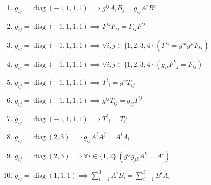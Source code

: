 \documentclass[11pt,a4paper]{article}
\begin{document}
\begin{enumerate}
\item $\displaystyle g_{ij} = \operatorname{diag}(-1, 1, 1, 1) \implies g^{ij} A_{i} B_{j} = g_{ij} A^{i} B^{j}$
\item $\displaystyle g_{ij} = \operatorname{diag}(-1, 1, 1, 1) \implies F^{ij} F_{ij} = F_{ij} F^{ij}$
\item $\displaystyle g_{ij} = \operatorname{diag}(-1, 1, 1, 1) \implies \forall i, j \in \{1, 2, 3, 4\}\ \left( F^{ij} = g^{ik} g^{jl} F_{kl} \right)$
\item $\displaystyle g_{ij} = \operatorname{diag}(-1, 1, 1, 1) \implies \forall i, j \in \{1, 2, 3, 4\}\ \left( g_{ik} F^{k}{}_{j} = F_{ij} \right)$
\item $\displaystyle g_{ij} = \operatorname{diag}(-1, 1, 1, 1) \implies T^{i}{}_{i} = g^{ij} T_{ij}$
\item $\displaystyle g_{ij} = \operatorname{diag}(-1, 1, 1, 1) \implies g^{ij} T_{ij} = g_{ij} T^{ij}$
\item $\displaystyle g_{ij} = \operatorname{diag}(-1, 1, 1, 1) \implies T^{i}{}_{i} = T_{i}{}^{i}$
\item $\displaystyle g_{ij} = \operatorname{diag}(2, 3) \implies g_{ij} A^{i} A^{j} = A^{i} A_{i}$
\item $\displaystyle g_{ij} = \operatorname{diag}(2, 3) \implies \forall i \in \{1, 2\}\ \left( g^{ij} g_{jk} A^{k} = A^{i} \right)$
\item $\displaystyle g_{ij} = \operatorname{diag}(1, 1, 1) \implies \sum_{i=1}^{3} A^{i} B_{i} = \sum_{i=1}^{3} B^{i} A_{i}$
\end{enumerate}
\end{document}
